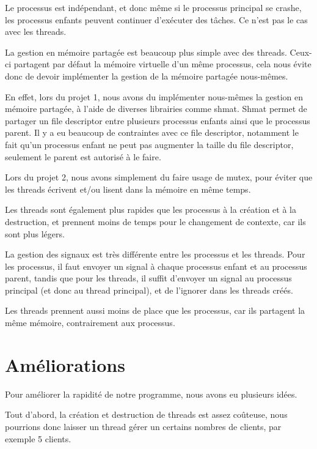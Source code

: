 \documentclass[utf8]{article}
\begin{document}
\begin{large}
Le processus est indépendant, et donc même si le processus principal se crashe,
les processus enfants peuvent continuer d'exécuter des tâches. Ce n'est pas le
cas avec les threads.

La gestion en mémoire partagée est beaucoup plus simple avec des threads.
Ceux-ci partagent par défaut la mémoire virtuelle d'un même processus, cela nous
évite donc de devoir implémenter la gestion de la mémoire partagée nous-mêmes.
\par
En effet, lors du projet 1, nous avons du implémenter nous-mêmes la gestion en
mémoire partagée, à l'aide de diverses librairies comme shmat. Shmat permet de
partager un file descriptor entre plusieurs processus enfants ainsi que le
processus parent. Il y a eu beaucoup de contraintes avec ce file descriptor,
notamment le fait qu'un processus enfant ne peut pas augmenter la taille du file
descriptor, seulement le parent est autorisé à le faire. 
\par
Lors du projet 2, nous
avons simplement du faire usage de mutex, pour éviter que les threads écrivent
et/ou lisent dans la mémoire en même temps.
\par
Les threads sont également plus rapides que les processus à la création et à la
destruction, et prennent moins de temps pour le changement de contexte, car ils
sont plus légers.\par La gestion des signaux est très différente entre les
processus et les threads. Pour les processus, il faut envoyer un signal à chaque
processus enfant et au processus parent, tandis que pour les threads, il suffit
d'envoyer un signal au processus principal (et donc au thread principal), et de
l'ignorer dans les threads créés.
\par
Les threads prennent aussi moins de place que les processus, car ils partagent
la même mémoire, contrairement aux processus.




\par
\section{Améliorations}
\par
\indent

Pour améliorer la rapidité de notre programme, nous avons eu plusieurs idées.

Tout d'abord, la création et destruction de threads est assez coûteuse, nous pourrions donc
laisser un thread gérer un certains nombres de clients, par exemple 5 clients.
\par


\end{large}
\end{document}
